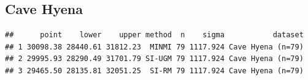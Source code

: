 \documentclass[
]{article}
\newenvironment{Shaded}{\begin{snugshade}}{\end{snugshade}}
\newcommand{\AttributeTok}[1]{\textcolor[rgb]{0.77,0.63,0.00}{#1}}
\newcommand{\DecValTok}[1]{\textcolor[rgb]{0.00,0.00,0.81}{#1}}
\newcommand{\FunctionTok}[1]{\textcolor[rgb]{0.00,0.00,0.00}{#1}}
\newcommand{\NormalTok}[1]{#1}
\newcommand{\OtherTok}[1]{\textcolor[rgb]{0.56,0.35,0.01}{#1}}
\newcommand{\SpecialCharTok}[1]{\textcolor[rgb]{0.00,0.00,0.00}{#1}}
\newcommand{\StringTok}[1]{\textcolor[rgb]{0.31,0.60,0.02}{#1}}
\begin{document}
\hypertarget{cave-hyena}{%
\subsection{Cave Hyena}\label{cave-hyena}}

\begin{Shaded}
\end{Shaded}

\begin{verbatim}
##      point    lower    upper method  n    sigma           dataset
## 1 30098.38 28440.61 31812.23  MINMI 79 1117.924 Cave Hyena (n=79)
## 2 29995.93 28290.49 31701.79 SI-UGM 79 1117.924 Cave Hyena (n=79)
## 3 29465.50 28135.81 32051.25  SI-RM 79 1117.924 Cave Hyena (n=79)
\end{verbatim}
\end{document}
